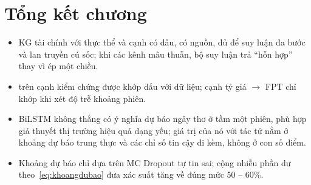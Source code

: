 
\section{Tổng kết chương}
\begin{itemize}
  \item KG tài chính với  thực thể và  cạnh có dấu, có nguồn, đủ để suy
        luận đa bước và lan truyền cú sốc; khi các kênh mâu thuẫn, bộ suy luận trả ``hỗn hợp'' thay vì ép một chiều.
  \item {} trên  cạnh kiểm chứng được khớp dấu với dữ liệu; cạnh tỷ giá
        $\to$ FPT chỉ khớp khi xét độ trễ khoảng  phiên.
  \item BiLSTM không thắng có ý nghĩa dự báo ngây thơ ở tầm một phiên, phù hợp giả thuyết thị trường hiệu quả dạng
        yếu; giá trị của nó với tác tử nằm ở khoảng dự báo trung thực và các chỉ số tin cậy đi kèm, không ở con số
        điểm.
  \item Khoảng dự báo chỉ dựa trên MC Dropout tự tin sai; cộng nhiễu phần dư theo~\eqref{eq:khoangdubao} đưa xác
        suất tăng về đúng mức 50 -- 60\%.
\end{itemize}
